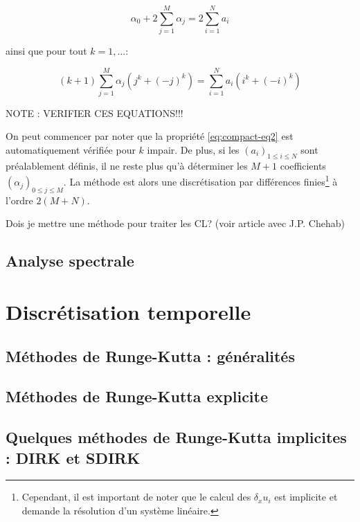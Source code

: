 \begin{equation}
  \label{eq:compact-eq1}
  \alpha_0 + 2 \sum_{j=1}^M \alpha_j = 2 \sum_{i=1}^N a_i
\end{equation}

ainsi que pour tout $k=1, ...$:

\begin{equation}
  \label{eq:compact-eq2}
  \left( k+1 \right) \sum_{j=1}^M \alpha_j \left( j^k + (-j)^k \right) = \sum_{i=1}^N a_i \left( i^k + (-i)^k \right)
\end{equation}

NOTE : VERIFIER CES EQUATIONS!!!

On peut commencer par noter que la propriété \eqref{eq:compact-eq2} est automatiquement vérifiée pour $k$ impair. De plus, si les $(a_i)_{1 \leq i \leq N}$ sont préalablement définis, il ne reste plus qu'à déterminer les $M+1$ coefficients $(\alpha_j)_{0 \leq j \leq M}$. La méthode est alors une discrétisation par différences finies\footnote{Cependant, il est important de noter que le calcul des $\delta_x u_i$ est implicite et demande la résolution d'un système linéaire.} à l'ordre $2(M+N)$.








Dois je mettre une méthode pour traiter les CL? (voir article avec J.P. Chehab)

\subsection{Analyse spectrale}


\section{Discrétisation temporelle}

\subsection{Méthodes de Runge-Kutta : généralités}

\subsection{Méthodes de Runge-Kutta explicite}

\subsection{Quelques méthodes de Runge-Kutta implicites : DIRK et SDIRK}

